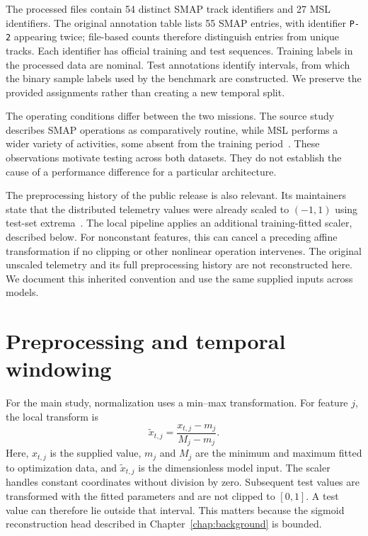 The processed files contain \num{54} distinct \ac{SMAP} track identifiers
and \num{27} \ac{MSL} identifiers. The original annotation table lists
\num{55} \ac{SMAP} entries, with identifier \texttt{P-2} appearing twice;
file-based counts therefore distinguish entries from unique tracks.
Each identifier has official training and test sequences. Training labels
in the processed data are nominal. Test annotations identify intervals,
from which the binary sample labels used by the benchmark are constructed.
We preserve the provided assignments rather than creating a new temporal
split.

The operating conditions differ between the two missions. The source study
describes \ac{SMAP} operations as comparatively routine, while \ac{MSL}
performs a wider variety of activities, some absent from the training
period~\cite{Hundman2018Spacecraft}. These observations motivate testing
across both datasets. They do not establish the cause of a performance
difference for a particular architecture.

The preprocessing history of the public release is also relevant. Its
maintainers state that the distributed telemetry values were already scaled
to \((-1,1)\) using test-set extrema~\cite{TelemanomReferenceData}. The
local pipeline applies an additional training-fitted scaler, described
below. For nonconstant features, this can cancel a preceding affine
transformation if no clipping or other nonlinear operation intervenes.
The original unscaled telemetry and its full preprocessing history are
not reconstructed here. We document this inherited convention and use
the same supplied inputs across models.

\section{Preprocessing and temporal windowing}
\label{sec:datasets-preprocessing}
For the main study, normalization uses a min--max transformation. For feature
\(j\), the local transform is
\begin{equation}
  \widetilde{x}_{t,j} =
  \frac{x_{t,j}-m_j}{M_j-m_j}.
  \label{eq:datasets-normalization}
\end{equation}
Here, \(x_{t,j}\) is the supplied value, \(m_j\) and \(M_j\) are the
minimum and maximum fitted to optimization data, and
\(\widetilde{x}_{t,j}\) is the dimensionless model input. The scaler handles
constant coordinates without division by zero. Subsequent test values are
transformed with the fitted parameters and are not clipped to \([0,1]\).
A test value can therefore lie outside that interval. This matters because
the sigmoid reconstruction head described in Chapter~\ref{chap:background}
is bounded.

